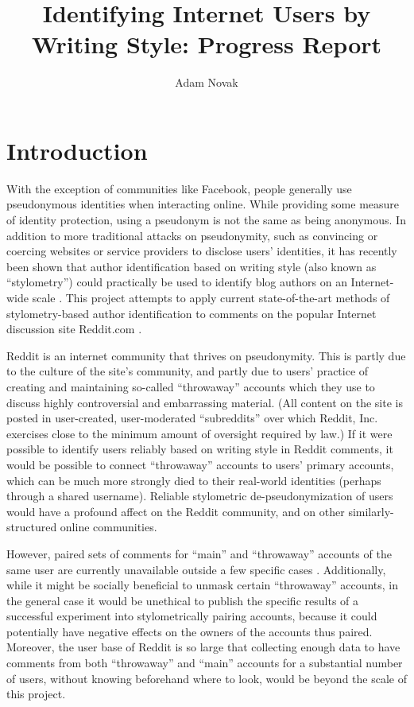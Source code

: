 \documentclass{article}
\author{Adam Novak}
\title{Identifying Internet Users by Writing Style: Progress Report}
\begin{document}
\maketitle

\begin{abstract}
\end{abstract}

\section{Introduction}
With the exception of communities like Facebook, people generally use pseudonymous identities when interacting online. While providing some measure of identity protection, using a pseudonym is not the same as being anonymous. In addition to more traditional attacks on pseudonymity, such as convincing or coercing websites or service providers to disclose users' identities, it has recently been shown that author identification based on writing style (also known as ``stylometry'') could practically be used to identify blog authors on an Internet-wide scale \cite{narayanan2012feasibility}. This project attempts to apply current state-of-the-art methods of stylometry-based author identification to comments on the popular Internet discussion site Reddit.com \cite{reddit2012reddit}.

Reddit is an internet community that thrives on pseudonymity. This is partly due to the culture of the site's community, and partly due to users' practice of creating and maintaining so-called ``throwaway'' accounts which they use to discuss highly controversial and embarrassing material. (All content on the site is posted in user-created, user-moderated ``subreddits'' over which Reddit, Inc. exercises close to the minimum amount of oversight required by law.) If it were possible to identify users reliably based on writing style in Reddit comments, it would be possible to connect ``throwaway'' accounts to users' primary accounts, which can be much more strongly died to their real-world identities (perhaps through a shared username). Reliable stylometric de-pseudonymization of users would have a profound affect on the Reddit community, and on other similarly-structured online communities.

However, paired sets of comments for ``main'' and ``throwaway'' accounts of the same user are currently unavailable outside a few specific cases \cite{chen2012unmasking, fitzpatrick2012man}. Additionally, while it might be socially beneficial to unmask certain ``throwaway'' accounts, in the general case it would be unethical to publish the specific results of a successful experiment into stylometrically pairing accounts, because it could potentially have negative effects on the owners of the accounts thus paired. Moreover, the user base of Reddit is so large that collecting enough data to have comments from both ``throwaway'' and ``main'' accounts for a substantial number of users, without knowing beforehand where to look, would be beyond the scale of this project.
\end{document}

